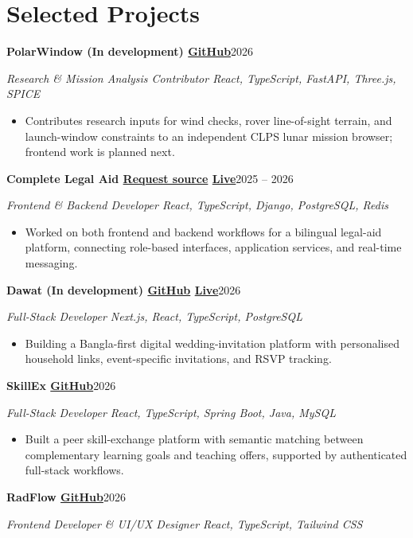 \documentclass[10pt, a4paper]{article}
\newcommand{\entry}[2]{\par\textbf{#1}\hfill #2\par}
\newcommand{\sub}[1]{\textit{#1}\par}
\begin{document}
\section{Selected Projects}
\entry{PolarWindow \textnormal{(In development)} \textbar{} \href{https://github.com/MdAhbab/PolarWindow}{GitHub}}{2026}
\sub{Research \& Mission Analysis Contributor \textbar{} React, TypeScript, FastAPI, Three.js, SPICE}
\begin{itemize}
    \item Contributes research inputs for wind checks, rover line-of-sight terrain, and launch-window constraints to an independent CLPS lunar mission browser; frontend work is planned next.
\end{itemize}
\entry{Complete Legal Aid \textbar{} \href{mailto:i.m.tanjamul@gmail.com?subject=Source\%20code\%20request:\%20Complete\%20Legal\%20Aid}{Request source} \textbar{} \href{https://complete-legal-aid-beta.vercel.app/}{Live}}{2025 -- 2026}
\sub{Frontend \& Backend Developer \textbar{} React, TypeScript, Django, PostgreSQL, Redis}
\begin{itemize}
    \item Worked on both frontend and backend workflows for a bilingual legal-aid platform, connecting role-based interfaces, application services, and real-time messaging.
\end{itemize}
\entry{Dawat \textnormal{(In development)} \textbar{} \href{https://github.com/Tanjamul-Azad/Dawat}{GitHub} \textbar{} \href{https://dawatcard.netlify.app/}{Live}}{2026}
\sub{Full-Stack Developer \textbar{} Next.js, React, TypeScript, PostgreSQL}
\begin{itemize}
    \item Building a Bangla-first digital wedding-invitation platform with personalised household links, event-specific invitations, and RSVP tracking.
\end{itemize}
\entry{SkillEx \textbar{} \href{https://github.com/Tanjamul-Azad/SkillEx}{GitHub}}{2026}
\sub{Full-Stack Developer \textbar{} React, TypeScript, Spring Boot, Java, MySQL}
\begin{itemize}
    \item Built a peer skill-exchange platform with semantic matching between complementary learning goals and teaching offers, supported by authenticated full-stack workflows.
\end{itemize}
\entry{RadFlow \textbar{} \href{https://github.com/Tanjamul-Azad/RadFlow}{GitHub}}{2026}
\sub{Frontend Developer \& UI/UX Designer \textbar{} React, TypeScript, Tailwind CSS}
\end{document}
